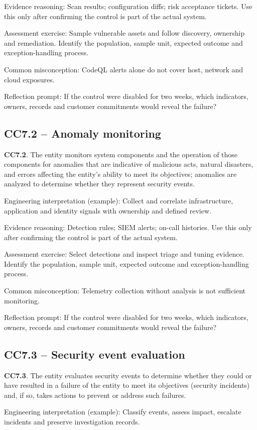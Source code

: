 \documentclass[10pt,oneside]{report}
\begin{document}
Evidence reasoning: Scan results; configuration diffs; risk acceptance tickets. Use this only after confirming the control is part of the actual system.

Assessment exercise: Sample vulnerable assets and follow discovery, ownership and remediation. Identify the population, sample unit, expected outcome and exception-handling process.

Common misconception: CodeQL alerts alone do not cover host, network and cloud exposures.

Reflection prompt: If the control were disabled for two weeks, which indicators, owners, records and customer commitments would reveal the failure?

\subsection{CC7.2 -- Anomaly monitoring}
\begin{aicpabox}
\textbf{CC7.2}. The entity monitors system components and the operation of those components for anomalies that are indicative of malicious acts, natural disasters, and errors affecting the entity's ability to meet its objectives; anomalies are analyzed to determine whether they represent security events.\par{}
\end{aicpabox}
Engineering interpretation (example): Collect and correlate infrastructure, application and identity signals with ownership and defined review.

Evidence reasoning: Detection rules; SIEM alerts; on-call histories. Use this only after confirming the control is part of the actual system.

Assessment exercise: Select detections and inspect triage and tuning evidence. Identify the population, sample unit, expected outcome and exception-handling process.

Common misconception: Telemetry collection without analysis is not sufficient monitoring.

Reflection prompt: If the control were disabled for two weeks, which indicators, owners, records and customer commitments would reveal the failure?

\subsection{CC7.3 -- Security event evaluation}
\begin{aicpabox}
\textbf{CC7.3}. The entity evaluates security events to determine whether they could or have resulted in a failure of the entity to meet its objectives (security incidents) and, if so, takes actions to prevent or address such failures.\par{}
\end{aicpabox}
Engineering interpretation (example): Classify events, assess impact, escalate incidents and preserve investigation records.
\end{document}
